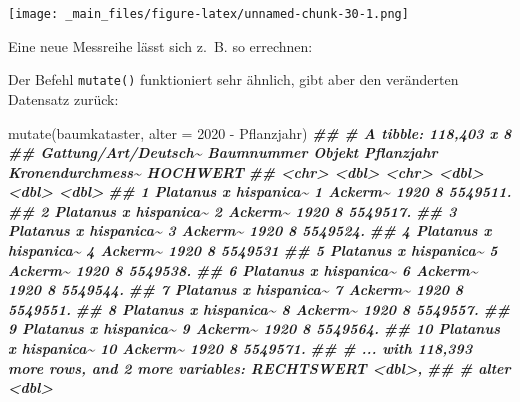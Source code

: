 \documentclass[11pt,german,a4paper]{article}
\newenvironment{Shaded}{\begin{snugshade}}{\end{snugshade}}
\newcommand{\AttributeTok}[1]{\textcolor[rgb]{0.77,0.63,0.00}{#1}}
\newcommand{\DecValTok}[1]{\textcolor[rgb]{0.00,0.00,0.81}{#1}}
\newcommand{\DocumentationTok}[1]{\textcolor[rgb]{0.56,0.35,0.01}{\textbf{\textit{#1}}}}
\newcommand{\FunctionTok}[1]{\textcolor[rgb]{0.00,0.00,0.00}{#1}}
\newcommand{\NormalTok}[1]{#1}
\newcommand{\OtherTok}[1]{\textcolor[rgb]{0.56,0.35,0.01}{#1}}
\newcommand{\SpecialCharTok}[1]{\textcolor[rgb]{0.00,0.00,0.00}{#1}}
\begin{document}
\texttt{[image: \_main\_files/figure-latex/unnamed-chunk-30-1.png]}

Eine neue Messreihe lässt sich z.~B. so errechnen:

\begin{Shaded}
\end{Shaded}

Der Befehl \texttt{mutate()} funktioniert sehr ähnlich, gibt aber den veränderten Datensatz zurück:

\begin{Shaded}
\begin{Highlighting}[]
\FunctionTok{mutate}\NormalTok{(baumkataster, }\AttributeTok{alter =} \DecValTok{2020} \SpecialCharTok{{-}}\NormalTok{ Pflanzjahr)}
\DocumentationTok{\#\# \# A tibble: 118,403 x 8}
\DocumentationTok{\#\#    \textasciigrave{}Gattung/Art/Deutsch\textasciitilde{} Baumnummer Objekt  Pflanzjahr Kronendurchmess\textasciitilde{} HOCHWERT}
\DocumentationTok{\#\#    \textless{}chr\textgreater{}                      \textless{}dbl\textgreater{} \textless{}chr\textgreater{}        \textless{}dbl\textgreater{}            \textless{}dbl\textgreater{}    \textless{}dbl\textgreater{}}
\DocumentationTok{\#\#  1 Platanus x hispanica\textasciitilde{}          1 Ackerm\textasciitilde{}       1920                8 5549511.}
\DocumentationTok{\#\#  2 Platanus x hispanica\textasciitilde{}          2 Ackerm\textasciitilde{}       1920                8 5549517.}
\DocumentationTok{\#\#  3 Platanus x hispanica\textasciitilde{}          3 Ackerm\textasciitilde{}       1920                8 5549524.}
\DocumentationTok{\#\#  4 Platanus x hispanica\textasciitilde{}          4 Ackerm\textasciitilde{}       1920                8 5549531 }
\DocumentationTok{\#\#  5 Platanus x hispanica\textasciitilde{}          5 Ackerm\textasciitilde{}       1920                8 5549538.}
\DocumentationTok{\#\#  6 Platanus x hispanica\textasciitilde{}          6 Ackerm\textasciitilde{}       1920                8 5549544.}
\DocumentationTok{\#\#  7 Platanus x hispanica\textasciitilde{}          7 Ackerm\textasciitilde{}       1920                8 5549551.}
\DocumentationTok{\#\#  8 Platanus x hispanica\textasciitilde{}          8 Ackerm\textasciitilde{}       1920                8 5549557.}
\DocumentationTok{\#\#  9 Platanus x hispanica\textasciitilde{}          9 Ackerm\textasciitilde{}       1920                8 5549564.}
\DocumentationTok{\#\# 10 Platanus x hispanica\textasciitilde{}         10 Ackerm\textasciitilde{}       1920                8 5549571.}
\DocumentationTok{\#\# \# ... with 118,393 more rows, and 2 more variables: RECHTSWERT \textless{}dbl\textgreater{},}
\DocumentationTok{\#\# \#   alter \textless{}dbl\textgreater{}}
\end{Highlighting}
\end{Shaded}
\end{document}
